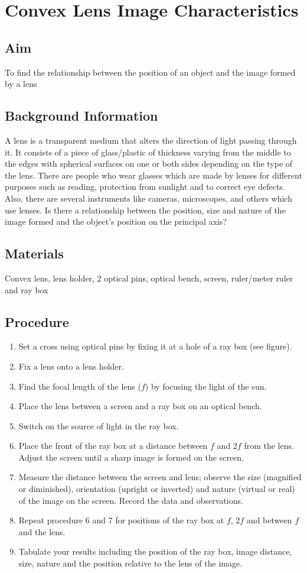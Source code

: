 \chapter{Convex Lens Image Characteristics}

\section{Aim}
To find the relationship between the position of an object and the image formed by a lens

\section{Background Information}
A lens is a transparent medium that alters the direction of light passing through it. It consists of a piece of glass\slash plastic of thickness varying from the middle to the edges with spherical surfaces on one or both sides depending on the type of the lens. There are people who wear glasses which are made by lenses for different purposes such as reading, protection from sunlight and to correct eye defects. Also, there are several instruments like cameras, microscopes, and others which use lenses. Is there a relationship between the position, size and nature of the image formed and the object’s position on the principal axis? 

\section{Materials}
Convex lens, lens holder, 2 optical pins, optical bench, screen, ruler\slash meter ruler and ray box

\section{Procedure}
\begin{enumerate}
\item Set a cross using optical pins by fixing it at a hole of a ray box (see figure).
\item Fix a lens onto a lens holder.
\item Find the focal length of the lens ($f$) by focusing the light of the sun.
\item Place the lens between a screen and a ray box on an optical bench.
\item Switch on the source of light in the ray box.
\item Place the front of the ray box at a distance between $f$ and 2$f$ from the lens. Adjust the screen until a sharp image is formed on the screen. 
\item Measure the distance between the screen and lens; observe the size (magnified or diminished), orientation (upright or inverted) and nature (virtual or real) of the image on the screen. Record the data and observations.
\item Repeat procedure 6 and 7 for positions of the ray box at $f$, 2$f$ and between $f$ and the lens.
\item Tabulate your results including the position of the ray box, image distance, size, nature and the position relative to the lens of the image.
\end{enumerate}

